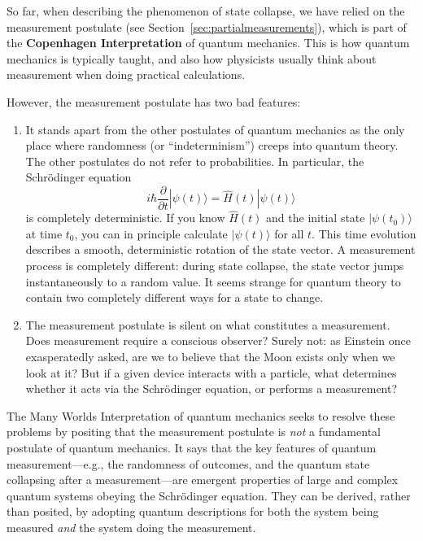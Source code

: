 \documentclass[prx,12pt]{revtex4-2}
\begin{document}
So far, when describing the phenomenon of state collapse, we have
relied on the measurement postulate (see
Section~\ref{sec:partialmeasurements}), which is part of the
\textbf{Copenhagen Interpretation} of quantum mechanics.  This is how
quantum mechanics is typically taught, and also how physicists usually
think about measurement when doing practical calculations.

However, the measurement postulate has two bad features:

\begin{enumerate}
\item It stands apart from the other postulates of quantum mechanics
  as the only place where randomness (or ``indeterminism'') creeps
  into quantum theory.  The other postulates do not refer to
  probabilities.  In particular, the Schr\"odinger equation
\begin{equation}
  i\hbar\frac{\partial}{\partial t}|\psi(t)\rangle = \hat{H}(t) |\psi(t)\rangle
\end{equation}
is completely deterministic.  If you know $\hat{H}(t)$ and the initial
state $|\psi(t_0)\rangle$ at time $t_0$, you can in principle
calculate $|\psi(t)\rangle$ for all $t$.  This time evolution
describes a smooth, deterministic rotation of the state vector.  A
measurement process is completely different: during state collapse,
the state vector jumps instantaneously to a random value.  It seems
strange for quantum theory to contain two completely different ways
for a state to change.

\item The measurement postulate is silent on what constitutes a
  measurement.  Does measurement require a conscious observer?  Surely
  not: as Einstein once exasperatedly asked, are we to believe that
  the Moon exists only when we look at it?  But if a given device
  interacts with a particle, what determines whether it acts via the
  Schr\"odinger equation, or performs a measurement?
\end{enumerate}

The Many Worlds Interpretation of quantum mechanics seeks to resolve
these problems by positing that the measurement postulate is
\textit{not} a fundamental postulate of quantum mechanics.  It says
that the key features of quantum measurement---e.g., the randomness of
outcomes, and the quantum state collapsing after a measurement---are
emergent properties of large and complex quantum systems obeying the
Schr\"odinger equation.  They can be derived, rather than posited, by
adopting quantum descriptions for both the system being measured
\textit{and} the system doing the measurement.
\end{document}
